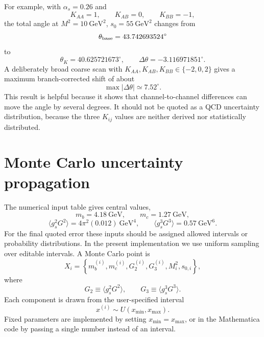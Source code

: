 \documentclass[11pt]{article}
\begin{document}
For example, with $\alpha_s=0.26$ and
\begin{equation}
  K_{AA}=1,\qquad K_{AB}=0,\qquad K_{BB}=-1,
\end{equation}
the total angle at $M^2=10~\mathrm{GeV}^2$, $s_0=55~\mathrm{GeV}^2$ changes
from
\begin{equation}
  \theta_{\rm base}=43.742693524^\circ
\end{equation}
to
\begin{equation}
  \theta_K=40.625721673^\circ,
  \qquad
  \Delta\theta=-3.116971851^\circ.
\end{equation}
A deliberately broad coarse scan with
$K_{AA},K_{AB},K_{BB}\in\{-2,0,2\}$ gives a maximum branch-corrected shift of
about
\begin{equation}
  \max|\Delta\theta|\simeq 7.52^\circ.
\end{equation}
This result is helpful because it shows that channel-to-channel differences
can move the angle by several degrees.  It should not be quoted as a QCD
uncertainty distribution, because the three \(K_{ij}\) values are neither
derived nor statistically distributed.

\section{Monte Carlo uncertainty propagation}

The numerical input table gives central values,
\begin{equation}
  m_b=4.18~\mathrm{GeV},\qquad
  m_c=1.27~\mathrm{GeV},
\end{equation}
\begin{equation}
  \langle g_s^2G^2\rangle = 4\pi^2(0.012)~\mathrm{GeV}^4,
  \qquad
  \langle g_s^3G^3\rangle = 0.57~\mathrm{GeV}^6.
\end{equation}
For the final quoted error these inputs should be assigned allowed intervals
or probability distributions.  In the present implementation we use uniform
sampling over editable intervals.  A Monte Carlo point is
\begin{equation}
  X_i =
  \left\{
    m_b^{(i)},m_c^{(i)},G_2^{(i)},G_3^{(i)},
    M_i^2,s_{0,i}
  \right\},
\end{equation}
where
\begin{equation}
  G_2\equiv\langle g_s^2G^2\rangle,\qquad
  G_3\equiv\langle g_s^3G^3\rangle.
\end{equation}
Each component is drawn from the user-specified interval
\begin{equation}
  x^{(i)}\sim U(x_{\min},x_{\max}).
\end{equation}
Fixed parameters are implemented by setting \(x_{\min}=x_{\max}\), or in the
Mathematica code by passing a single number instead of an interval.
\end{document}
